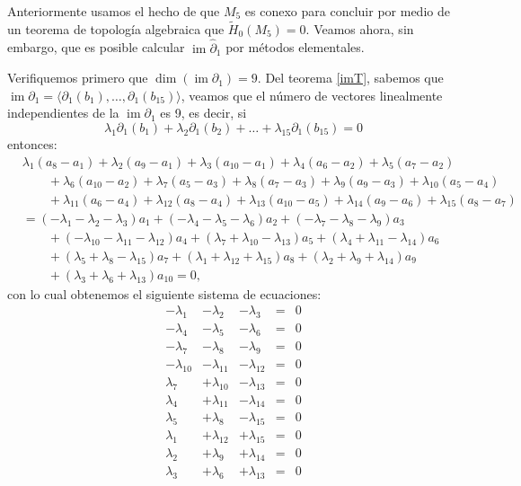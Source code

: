 \documentclass[12pt]{book}
\theoremstyle{definition}
\DeclareMathOperator{\im}{im}
\newcounter{in}
\begin{document}
Anteriormente usamos el hecho de que $M_{5}$ es conexo para concluir
por medio de un teorema de topología algebraica que $\widetilde
H_{0}(M_{5})=0$. Veamos ahora, sin embargo, que es posible
calcular $\im \widehat\partial_{1}$ por métodos elementales.

Verifiquemos primero que $\dim(\im \partial_{1})=9$. Del teorema
\ref{imT}, sabemos que
$\im \partial_{1}=\langle\partial_{1}(b_{1}),\ldots,\partial_{1}(b_{15})\rangle$,
veamos que el número de vectores linealmente independientes de la
$\im \partial_{1}$ es 9, es
decir, si
$$\lambda_{1}\partial_{1}(b_{1})+\lambda_{2}\partial_{1}(b_{2})+\ldots+\lambda_{15}\partial_{1}(b_{15})=0$$
entonces:
\begin{align*}
  &\lambda_{1}(a_{8}-a_{1})+\lambda_{2}(a_{9}-a_{1})+\lambda_{3}(a_{10}-a_{1})+\lambda_{4}(a_{6}-a_{2})+\lambda_{5}(a_{7}-a_{2})\\
  &\qquad
  {}+\lambda_{6}(a_{10}-a_{2})+\lambda_{7}(a_{5}-a_{3})+\lambda_{8}(a_{7}-a_{3})+\lambda_{9}(a_{9}-a_{3})+\lambda_{10}(a_{5}-a_{4})\\
  &\qquad{}+\lambda_{11}(a_{6}-a_{4})+\lambda_{12}(a_{8}-a_{4})+\lambda_{13}(a_{10}-a_{5})+\lambda_{14}(a_{9}-a_{6})+\lambda_{15}(a_{8}-a_{7})\\
  &=(-\lambda_{1}-\lambda_{2}-\lambda_{3})a_{1}+(-\lambda_{4}-\lambda_{5}-\lambda_{6})a_{2}+(-\lambda_{7}-\lambda_{8}-\lambda_{9})a_{3}\\
  &\qquad{}+(-\lambda_{10}-\lambda_{11}-\lambda_{12})a_{4}+(\lambda_{7}+\lambda_{10}-\lambda_{13})a_{5}+(\lambda_{4}+\lambda_{11}-\lambda_{14})a_{6}\\
  &\qquad{}+(\lambda_{5}+\lambda_{8}-\lambda_{15})a_{7}+(\lambda_{1}+\lambda_{12}+\lambda_{15})a_{8}+(\lambda_{2}+\lambda_{9}+\lambda_{14})a_{9}\\
  &\qquad{}+(\lambda_{3}+\lambda_{6}+\lambda_{13})a_{10}=0,
\end{align*}
con lo cual obtenemos el siguiente sistema de ecuaciones:
 \[\begin{array}{rrrrr}
   -\lambda_{1} & -\lambda_{2} & -\lambda_{3} & = & 0 \\
   -\lambda_{4} & -\lambda_{5} & -\lambda_{6} & = & 0 \\
   -\lambda_{7} & -\lambda_{8} & -\lambda_{9} & = & 0 \\
   -\lambda_{10} & -\lambda_{11} & -\lambda_{12} & = & 0 \\
   \lambda_{7} & +\lambda_{10} & -\lambda_{13} & = & 0 \\
   \lambda_{4} & +\lambda_{11} & -\lambda_{14} & = & 0 \\
   \lambda_{5} & +\lambda_{8} & -\lambda_{15} & = & 0 \\
   \lambda_{1} & +\lambda_{12} & +\lambda_{15} & = & 0 \\
   \lambda_{2} & +\lambda_{9} & +\lambda_{14} & = & 0 \\
   \lambda_{3} & +\lambda_{6} & +\lambda_{13} & = & 0 
 \end{array}\]
\end{document}
